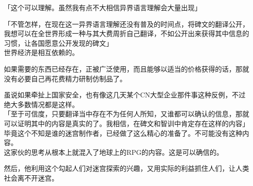 「这个可以理解。虽然我有点不大相信异界语言理解会大量出现」

「不管怎样，在现在这一异界语言理解还没有普及的时间点，将碑文的翻译公开，我想可以在全世界形成一种与其大费周折自己翻译，不如公开出来获得其中信息的习惯，让各国愿意公开发现的碑文」\\

世界经济是相互依赖的。

如果需要的东西已经存在，正被广泛使用，而且能够以适当的价格获得的话，那就没有必要自己再花费精力研制仿制品了。

虽说如果牵扯上国家安全，也有像这几天某个CN大型企业那件事这种反例，不过绝大多数情况都是这样。\\

「至于可信度，只要翻译当中存在不为任何人所知，又谁都可以确认的信息，那就可以证明其中的内容是真实的了。我相信，在碑文和智训中肯定存在这样的内容」\\

毕竟这个不知是谁的迷宫制作者，已经做了这么精心的准备了。不可能没有这种内容。\\

这家伙的思考从根本上就混入了地球上的RPG的内容。这是可以确信的。

然后，他利用这个勾起人们对迷宫探索的兴趣，又用实际的利益抓住人们，让人类社会离不开迷宫。

